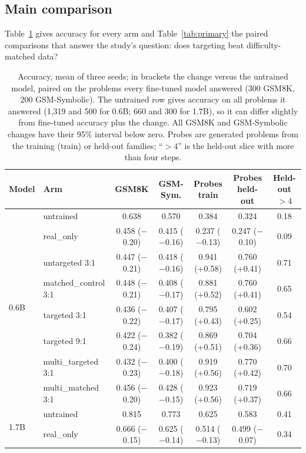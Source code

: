 \documentclass[11pt]{article}
\begin{document}
\subsection{Main comparison}
Table~\ref{tab:main} gives accuracy for every arm and Table~\ref{tab:primary} the paired comparisons that answer the
study's question: does targeting beat difficulty-matched data?

\begin{table}[t]
\centering
\caption{Accuracy, mean of three seeds; in brackets the change versus the untrained model, paired on the problems
every fine-tuned model answered (300 GSM8K, 200 GSM-Symbolic). The untrained row gives accuracy on all problems it
answered (1{,}319 and 500 for 0.6B; 660 and 300 for 1.7B), so it can differ slightly from fine-tuned accuracy plus the
change. All GSM8K and GSM-Symbolic changes have their 95\% interval below zero. Probes are generated problems from the
training (train) or held-out families; ``$>4$'' is the held-out slice with more than four steps.}
\label{tab:main}
\small
\begin{tabular}{llccccc}
\toprule
Model & Arm & GSM8K & GSM-Sym. & Probes train & Probes held-out & Held-out $>4$ \\
\midrule
\multirow{8}{*}{0.6B}
& untrained              & 0.638 & 0.570 & 0.384 & 0.324 & 0.18 \\
& real\_only             & 0.458 ($-$0.20) & 0.415 ($-$0.16) & 0.237 ($-$0.13) & 0.247 ($-$0.10) & 0.09 \\
& untargeted 3:1         & 0.447 ($-$0.21) & 0.418 ($-$0.16) & 0.941 (+0.58) & 0.760 (+0.41) & 0.71 \\
& matched\_control 3:1   & 0.448 ($-$0.21) & 0.408 ($-$0.17) & 0.881 (+0.52) & 0.760 (+0.41) & 0.65 \\
& targeted 3:1           & 0.436 ($-$0.22) & 0.407 ($-$0.17) & 0.795 (+0.43) & 0.602 (+0.25) & 0.54 \\
& targeted 9:1           & 0.422 ($-$0.24) & 0.382 ($-$0.19) & 0.869 (+0.51) & 0.704 (+0.36) & 0.66 \\
& multi\_targeted 3:1    & 0.432 ($-$0.23) & 0.400 ($-$0.18) & 0.919 (+0.56) & 0.770 (+0.42) & 0.70 \\
& multi\_matched 3:1     & 0.456 ($-$0.20) & 0.428 ($-$0.15) & 0.923 (+0.56) & 0.719 (+0.37) & 0.66 \\
\midrule
\multirow{8}{*}{1.7B}
& untrained              & 0.815 & 0.773 & 0.625 & 0.583 & 0.41 \\
& real\_only             & 0.666 ($-$0.15) & 0.625 ($-$0.14) & 0.514 ($-$0.13) & 0.499 ($-$0.07) & 0.34 \\

\end{tabular}
\end{table}
\end{document}

